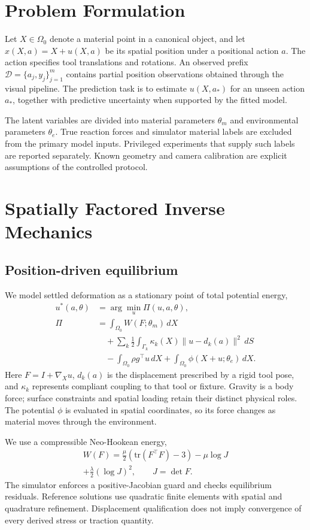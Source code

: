 \documentclass[10pt,twocolumn,letterpaper]{article}
\begin{document}
\section{Problem Formulation}
Let $X\in\Omega_0$ denote a material point in a canonical object, and let $x(X,a)=X+u(X,a)$ be its spatial position under a positional action $a$. The action specifies tool translations and rotations. An observed prefix $\mathcal D=\{a_j,y_j\}_{j=1}^m$ contains partial position observations obtained through the visual pipeline. The prediction task is to estimate $u(X,a_*)$ for an unseen action $a_*$, together with predictive uncertainty when supported by the fitted model.

The latent variables are divided into material parameters $\theta_m$ and environmental parameters $\theta_e$. True reaction forces and simulator material labels are excluded from the primary model inputs. Privileged experiments that supply such labels are reported separately. Known geometry and camera calibration are explicit assumptions of the controlled protocol.

\section{Spatially Factored Inverse Mechanics}
\subsection{Position-driven equilibrium}
We model settled deformation as a stationary point of total potential energy,
\begin{align}
 u^*(a,\theta)&=\arg\min_u\Pi(u,a,\theta),\\
 \Pi&=\int_{\Omega_0}W(F;\theta_m)\,dX
\nonumber\\
 &\quad+\sum_k\frac12\int_{\Gamma_k}\kappa_k(X)\|u-d_k(a)\|^2\,dS\nonumber\\
 &\quad-\int_{\Omega_0}\rho g^\top u\,dX
 +\int_{\Omega_0}\phi(X+u;\theta_e)\,dX.\label{eq:energy}
\end{align}
Here $F=I+\nabla_Xu$, $d_k(a)$ is the displacement prescribed by a rigid tool pose, and $\kappa_k$ represents compliant coupling to that tool or fixture. Gravity is a body force; surface constraints and spatial loading retain their distinct physical roles. The potential $\phi$ is evaluated in spatial coordinates, so its force changes as material moves through the environment.

We use a compressible Neo-Hookean energy,
\begin{multline}
 W(F)=\frac\mu2(\mathrm{tr}(F^\top F)-3)-\mu\log J
       \\
 +\frac\lambda2(\log J)^2,\qquad J=\det F.
\end{multline}
The simulator enforces a positive-Jacobian guard and checks equilibrium residuals. Reference solutions use quadratic finite elements with spatial and quadrature refinement. Displacement qualification does not imply convergence of every derived stress or traction quantity.
\end{document}
